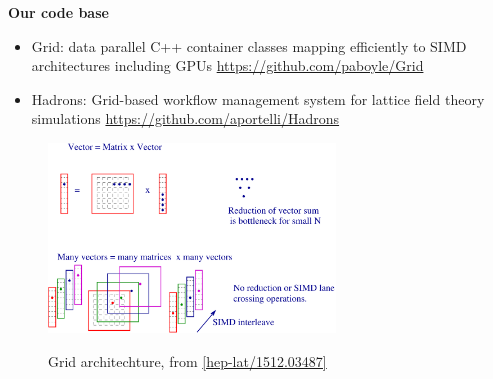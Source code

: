 \documentclass[english,xcolor=pst,11pt]{beamer}
\begin{document}
\begin{frame}
 \textbf{Our code base}
 \begin{itemize}
  \item Grid: data parallel C++ container classes mapping efficiently to SIMD architectures including GPUs \url{https://github.com/paboyle/Grid}
  \item Hadrons: Grid-based workflow management system for lattice field theory simulations \url{https://github.com/aportelli/Hadrons}
 \end{itemize}

 \begin{figure}[H]
	\centering
    {\includegraphics[width=3in]{diagrams/grid.pdf}}
    \caption{Grid architechture, from \url{[hep-lat/1512.03487]}}
\end{figure}
\end{frame}
\end{document}
